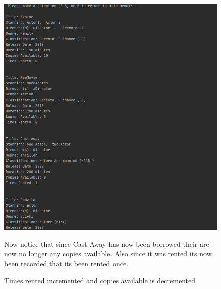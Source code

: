 \documentclass[a4paper,12pt]{article}
\begin{document}
\begin{figure}[!htb]
\centering
\includegraphics[width=1\textwidth]{9}
\caption{Times rented incremented and copies available is decremented}
\medskip
\small
Now notice that since Cast Away has now been borrowed their are now no longer any copies available. Also since it was rented its now been recorded that its been rented once.
\end{figure}
\end{document}
